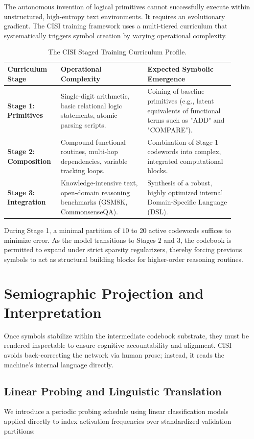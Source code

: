 The autonomous invention of logical primitives cannot successfully execute within unstructured, high-entropy text environments. It requires an evolutionary gradient. The CISI training framework uses a multi-tiered curriculum that systematically triggers symbol creation by varying operational complexity.

\begin{table}[h]
\centering
\small
\begin{tabular}{p{0.20\linewidth}p{0.36\linewidth}p{0.36\linewidth}}
\hline
\textbf{Curriculum Stage} & \textbf{Operational Complexity} & \textbf{Expected Symbolic Emergence} \\
\hline
\textbf{Stage 1: Primitives} & Single-digit arithmetic, basic relational logic statements, atomic parsing scripts. & Coining of baseline primitives (e.g., latent equivalents of functional terms such as "ADD" and "COMPARE"). \\
\textbf{Stage 2: Composition} & Compound functional routines, multi-hop dependencies, variable tracking loops. & Combination of Stage 1 codewords into complex, integrated computational blocks. \\
\textbf{Stage 3: Integration} & Knowledge-intensive text, open-domain reasoning benchmarks (GSM8K, CommonsenseQA). & Synthesis of a robust, highly optimized internal Domain-Specific Language (DSL). \\
\hline
\end{tabular}
\caption{The CISI Staged Training Curriculum Profile.}
\label{tab:cisi-curriculum}
\end{table}

During Stage 1, a minimal partition of $10$ to $20$ active codewords suffices to minimize error. As the model transitions to Stages 2 and 3, the codebook is permitted to expand under strict sparsity regularizers, thereby forcing previous symbols to act as structural building blocks for higher-order reasoning routines.

\chapter{Semiographic Projection and Interpretation}

Once symbols stabilize within the intermediate codebook substrate, they must be rendered inspectable to ensure cognitive accountability and alignment. CISI avoids back-correcting the network via human prose; instead, it reads the machine's internal language directly.

\section{Linear Probing and Linguistic Translation}
We introduce a periodic probing schedule using linear classification models applied directly to index activation frequencies over standardized validation partitions:

